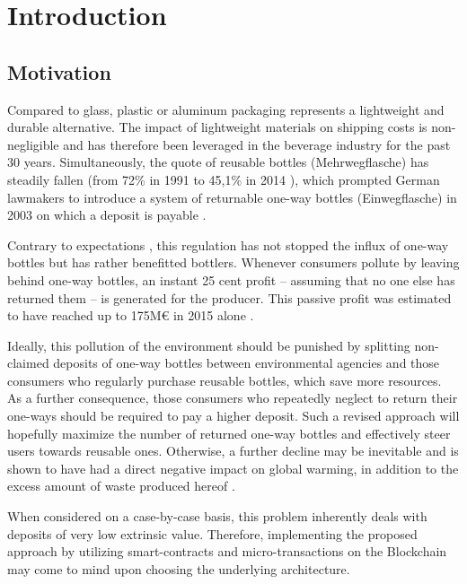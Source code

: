 
\chapter{Introduction}

\section{Motivation}
\label{sec:motivation}
Compared to glass, plastic or aluminum packaging represents a lightweight and durable alternative. The impact of lightweight materials on shipping costs is non-negligible and has therefore been leveraged in the beverage industry for the past 30 years. Simultaneously, the quote of reusable bottles (Mehrwegflasche) has steadily fallen (from 72\% in 1991 \cite[§ 9 Abs. 2]{verpackV} to 45,1\% in 2014 \cite{umweltBundesamt}), which prompted German lawmakers to introduce a system of returnable one-way bottles (Einwegflasche) in 2003 on which a deposit is payable \cite[§ 9 Abs. 2]{verpackV}. 

Contrary to expectations \cite[§ 8]{verpackV}, this regulation has not stopped the influx of one-way bottles but has rather benefitted bottlers. Whenever consumers pollute by leaving behind one-way bottles, an instant 25 cent profit -- assuming that no one else has returned them -- is generated for the producer. This passive profit was estimated to have reached up to 175M\euro{} in 2015 alone \cite{mehrwegSystem}. 


Ideally, this pollution of the environment should be punished by splitting non-claimed deposits of one-way bottles between environmental agencies and those consumers who regularly purchase reusable bottles, which save more resources. As a further consequence, those consumers who repeatedly neglect to return their one-ways should be required to pay a higher deposit. Such a revised approach will hopefully maximize the number of returned one-way bottles and effectively steer users towards reusable ones. Otherwise, a further decline may be inevitable and is shown to have had a direct negative impact on global warming, in addition to the excess amount of waste produced hereof \cite{einwegUmweltbelastung}.

When considered on a case-by-case basis, this problem inherently deals with deposits of very low extrinsic value. Therefore, implementing the proposed approach by utilizing smart-contracts and micro-transactions on the Blockchain may come to mind upon choosing the underlying architecture.

